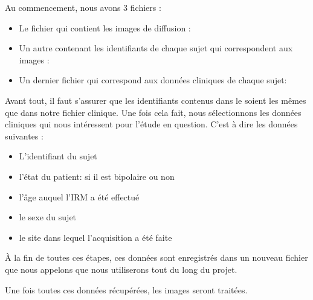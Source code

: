Au commencement, nous avons 3 fichiers :
\begin{itemize}
	\item Le fichier qui contient les images de diffusion : 
	\item Un autre contenant les identifiants de chaque sujet qui correspondent aux images : 
	\item Un dernier fichier qui correspond aux données cliniques de chaque sujet:  
\end{itemize}

Avant tout, il faut s'assurer que les identifiants contenus dans le  soient les mêmes que dans notre fichier clinique.
Une fois cela fait, nous sélectionnons les données cliniques qui nous intéressent pour l'étude en question. C'est à dire les données suivantes : 
\begin{itemize}
	\item L'identifiant du sujet
	\item l'état du patient: si il est bipolaire ou non
	\item l'âge auquel l'IRM a été effectué
	\item le sexe du sujet
	\item le site dans lequel l'acquisition a été faite 
\end{itemize}

À la fin de toutes ces étapes, ces données sont enregistrés dans un nouveau fichier que nous appelons  que nous utiliserons tout du long du projet.


Une fois toutes ces données récupérées, les images seront traitées. 